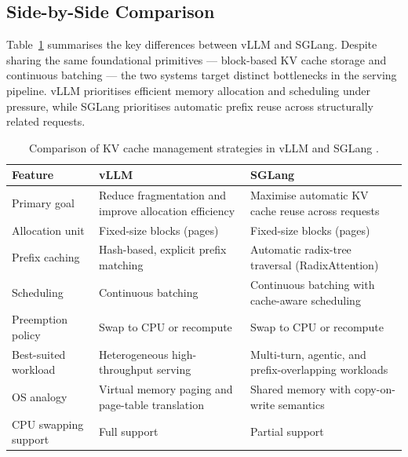 \documentclass[10pt, a4paper]{article}
\begin{document}
\subsection{Side-by-Side Comparison}

Table~\ref{tab:system_compare} summarises the key differences between
vLLM and SGLang.
Despite sharing the same foundational primitives --- block-based KV cache
storage and continuous batching --- the two systems target distinct
bottlenecks in the serving pipeline.
vLLM prioritises efficient memory allocation and scheduling under pressure,
while SGLang prioritises automatic prefix reuse across structurally related
requests.

\begin{table}[htbp]
    \centering
    \caption{Comparison of KV cache management strategies in vLLM
    \cite{kwon2023vllm} and SGLang \cite{zheng2024sglang}.}
    \label{tab:system_compare}
    \begin{tabular}{p{3.8cm} p{4.6cm} p{4.6cm}}
        \toprule
        \textbf{Feature} & \textbf{vLLM}
                         & \textbf{SGLang} \\
        \midrule
        Primary goal
            & Reduce fragmentation and improve allocation efficiency
            & Maximise automatic KV cache reuse across requests \\
        Allocation unit
            & Fixed-size blocks (pages)
            & Fixed-size blocks (pages) \\
        Prefix caching
            & Hash-based, explicit prefix matching
            & Automatic radix-tree traversal (RadixAttention) \\
        Scheduling
            & Continuous batching
            & Continuous batching with cache-aware scheduling \\
        Preemption policy
            & Swap to CPU or recompute
            & Swap to CPU or recompute \\
        Best-suited workload
            & Heterogeneous high-throughput serving
            & Multi-turn, agentic, and prefix-overlapping workloads \\
        OS analogy
            & Virtual memory paging and page-table translation
            & Shared memory with copy-on-write semantics \\
        CPU swapping support
            & Full support
            & Partial support \\
        \bottomrule
    \end{tabular}
\end{table}
\end{document}
